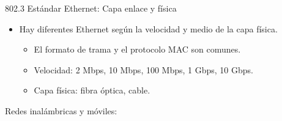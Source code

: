 \documentclass[12pt, twoside, openright]{report} %
\begin{document}
      802.3 Estándar Ethernet: Capa enlace y física

      \begin{itemize}
      \item
        Hay diferentes Ethernet según la velocidad y medio de la capa
        física.

        \begin{itemize}
        \item
          El formato de trama y el protocolo MAC son comunes.
        \item
          Velocidad: 2 Mbps, 10 Mbps, 100 Mbps, 1 Gbps, 10 Gbps.
        \item
          Capa física: fibra óptica, cable.
        \end{itemize}
      \end{itemize}

      Redes inalámbricas y móviles:
\end{document}
